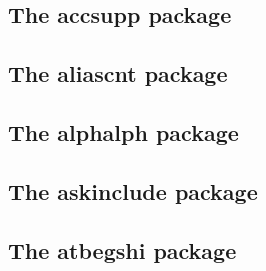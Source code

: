 \documentclass[a4paper,12pt]{article}
\makeatletter
\providecommand*{\plainTeX}{\mbox{plain-\TeX}}
\providecommand*{\eTeX}{$\csname m@th\endcsname\varepsilon$-\TeX}
\newcommand*{\xpackage}[1]{\textsf{#1}}
\newcommand*{\cs}[1]{\texttt{\textbackslash#1}}
\newcommand*{\tocinclude}[1]{%
  \setcounter{tocdepth}{3}%
  \begingroup
    \makeatletter
    \def\@prj{#1}%
    \let\contentsline\foreign@contentsline
  \endgroup
}
\def\foreign@contentsline#1#2#3#4{%
  \ifx\\#4\\%
    \csname l@#1\endcsname{#2}{#3}%
  \else
    \ifHy@linktocpage
      \csname l@#1\endcsname{{#2}}{%
        \hyper@linkfile{#3}{\@prj.pdf}{#4}%
      }%
    \else
      \csname l@#1\endcsname{%
        \hyper@linkfile{#2}{\@prj.pdf}{#4}%
      }{#3}%
    \fi
  \fi
}%
\newcommand*{\pkgsectformat}[1]{%
  \texorpdfstring{%
    \textcolor{link}{The} %
    \xpackage{#1} %
    \textcolor{link}{package}%
  }{#1}%
}
\makeatother
\begin{document}
\subsection{\pkgsectformat{accsupp}}
\label{accsupp}
\begin{abstract}
Since PDF 1.5 portions of a page can be marked for better
accessibility support.
For example, replacement texts or expansions of abbreviations can be
provided. Package \xpackage{accsupp} starts with providing a minimal
low-level interface for programmers. Status is experimental.
\end{abstract}
\tocinclude{accsupp}

\newpage
\subsection{\pkgsectformat{aliascnt}}
\label{aliascnt}
\begin{abstract}
Package \xpackage{aliascnt} introduces \emph{alias counters} that
share the same counter register and clear list.
\end{abstract}
\tocinclude{aliascnt}

\newpage
\subsection{\pkgsectformat{alphalph}}
\label{alphalph}
\begin{abstract}
The package provides methods to represent numbers with a limited
set of symbols. Both  and  are supported.
\end{abstract}
\tocinclude{alphalph}

\newpage
\subsection{\pkgsectformat{askinclude}}
\label{askinclude}
\begin{abstract}
This package replaces \cs{includeonly} by an interactive user
interface.
\end{abstract}
\tocinclude{askinclude}

\newpage
\subsection{\pkgsectformat{atbegshi}}
\label{atbegshi}
\begin{abstract}
This package is a modern reimplementation of package \xpackage{everyshi}
without the burden of compatibility. It makes use of \eTeX's if available.
Both \LaTeX\ and \plainTeX\ are supported.
\end{abstract}
\tocinclude{atbegshi}
\end{document}
